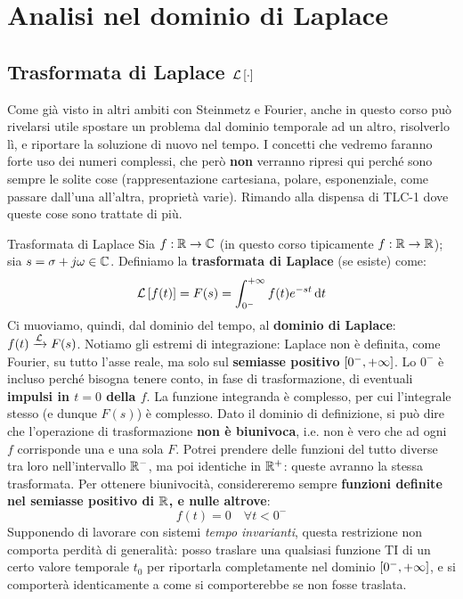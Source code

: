 \part{Analisi nel dominio di Laplace}

\chapter{Trasformata di Laplace $\mathcal{L}\left[ \cdot \right]$}
Come già visto in altri ambiti con Steinmetz e Fourier, anche in questo corso può rivelarsi utile spostare un problema dal dominio temporale ad un altro, risolverlo lì, e riportare la soluzione di nuovo nel tempo.
I concetti che vedremo faranno forte uso dei numeri complessi, che però \textbf{non} verranno ripresi qui perché sono sempre le solite cose (rappresentazione cartesiana, polare, esponenziale, come passare dall'una all'altra, proprietà varie). Rimando alla dispensa di TLC-1 dove queste cose sono trattate di più.
\begin{defin}{Trasformata di Laplace}{}
Sia $f: \mathbb{R} \rightarrow \mathbb{C}$ (in questo corso tipicamente $f: \mathbb{R} \rightarrow \mathbb{R}$); sia $s = \sigma + j\omega \in \mathbb{C}$. Definiamo la \textbf{trasformata di Laplace} (se esiste) come:
\begin{equation}
	\mathcal{L}\left[ f(t) \right] = F(s) = \int_{0^-}^{+\infty} f(t) e^{-st} \dd{t}
\end{equation} 
Ci muoviamo, quindi, dal dominio del tempo, al \textbf{dominio di Laplace}: $f(t) \xrightarrow{\mathcal{L}} F(s)$. Notiamo gli estremi di integrazione: Laplace non è definita, come Fourier, su tutto l'asse reale, ma solo sul \textbf{semiasse positivo} $[0^-, +\infty]$. Lo $0^-$ è incluso perché bisogna tenere conto, in fase di trasformazione, di eventuali \textbf{impulsi in $t = 0$ della $f$}. La funzione integranda è complesso, per cui l'integrale stesso (e dunque $F(s)$) è complesso. \bb Dato il dominio di definizione, si può dire che l'operazione di trasformazione \textbf{non è biunivoca}, i.e. non è vero che ad ogni $f$ corrisponde una e una sola $F$. Potrei prendere delle funzioni del tutto diverse tra loro nell'intervallo $\mathbb{R}^-$, ma poi identiche in $\mathbb{R}^+$: queste avranno la stessa trasformata. Per ottenere biunivocità, considereremo  sempre \textbf{funzioni definite nel semiasse positivo di $\mathbb{R}$, e nulle altrove}:
\begin{equation}
	f(t) = 0 \quad \forall t < 0^-
\end{equation}
Supponendo di lavorare con sistemi \textit{tempo invarianti}, questa restrizione non comporta perdità di generalità: posso traslare una qualsiasi funzione TI di un certo valore temporale $t_0$ per riportarla completamente nel dominio $[0^-, +\infty]$, e si comporterà identicamente a come si comporterebbe se non fosse traslata. 
\end{defin}


